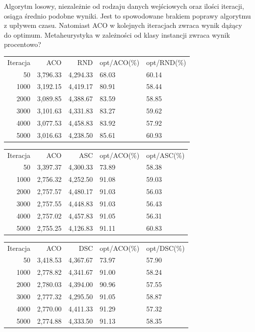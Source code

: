 \documentclass[10pt,a4paper]{article}
\begin{document}
Algorytm losowy, niezależnie od rodzaju danych wejściowych oraz ilości iteracji, osiąga średnio podobne wyniki. Jest to spowodowane brakiem poprawy algorytmu z upływem czasu. Natomiast ACO w kolejnych iteracjach zwraca wynik dążący do optimum.
Metaheurystyka w zależności od klasy instancji zwraca wynik procentowo?

\begin{tabular}{rrrll}
Iteracja & ACO & RND  & opt/ACO(\%) & opt/RND(\%) \\

50	& 3,796.33	& 4,294.33	& 68.03	& 60.14 \\
1000	& 3,192.15	& 4,419.17	& 80.91	& 58.44 \\
2000	& 3,089.85	& 4,388.67	& 83.59	& 58.85 \\
3000	& 3,101.63	& 4,331.83	& 83.27	& 59.62 \\
4000	& 3,077.53	& 4,458.83	& 83.92	& 57.92 \\
5000	& 3,016.63	& 4,238.50	& 85.61	& 60.93 \\
\end{tabular}

\begin{tabular}{rrrll}
Iteracja & ACO & ASC  & opt/ACO(\%) & opt/ASC(\%) \\

50	& 3,397.37	& 4,300.33	& 73.89 &	58.38\\
1000	& 2,756.32	& 4,252.50 &	91.08 &	59.03\\
2000	& 2,757.57	& 4,480.17	& 91.03 & 56.03\\
3000	& 2,757.55	& 4,448.83	& 91.03 &	56.43\\
4000	& 2,757.02	& 4,457.83	& 91.05 &	56.31\\
5000	& 2,755.25	& 4,126.83	& 91.11 &	60.83\\
\end{tabular}

\begin{tabular}{rrrll}
Iteracja & ACO & DSC  & opt/ACO(\%) & opt/DSC(\%) \\
50	& 3,418.53	& 4,367.67	& 73.97 &	57.90\\
1000	& 2,778.82	& 4,341.67	& 91.00 &	58.24\\
2000	& 2,780.03	& 4,394.00	& 90.96 & 57.55\\
3000	& 2,777.32	& 4,295.50	& 91.05 &	58.87\\
4000	& 2,770.00	& 4,411.33	& 91.29 &	57.32\\
5000	& 2,774.88	& 4,333.50	& 91.13 &	58.35\\

\end{tabular}
\end{document}
